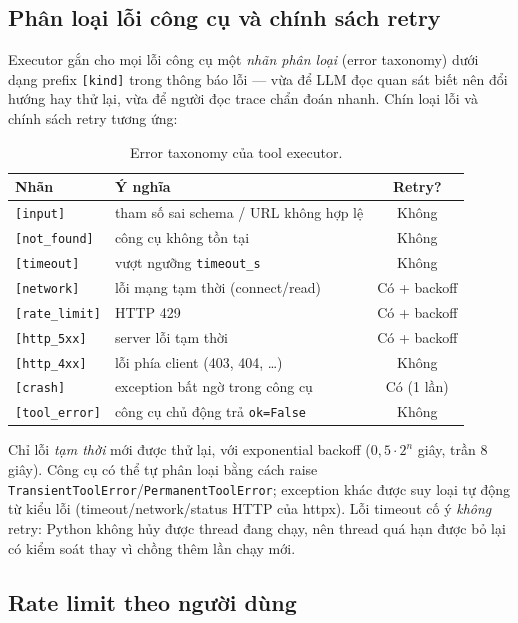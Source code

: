 \subsection{Phân loại lỗi công cụ và chính sách retry}
\label{sec:ky-thuat-taxonomy}

Executor gắn cho mọi lỗi công cụ một \emph{nhãn phân loại} (error taxonomy)
dưới dạng prefix \texttt{[kind]} trong thông báo lỗi --- vừa để LLM đọc quan
sát biết nên đổi hướng hay thử lại, vừa để người đọc trace chẩn đoán nhanh.
Chín loại lỗi và chính sách retry tương ứng:

\begin{table}[ht]
\centering
\caption{Error taxonomy của tool executor.}
\label{tab:error-taxonomy}
\begin{tabular}{llc}
\toprule
Nhãn & Ý nghĩa & Retry? \\
\midrule
\texttt{[input]}      & tham số sai schema / URL không hợp lệ & Không \\
\texttt{[not\_found]}  & công cụ không tồn tại                & Không \\
\texttt{[timeout]}    & vượt ngưỡng \texttt{timeout\_s}       & Không \\
\texttt{[network]}    & lỗi mạng tạm thời (connect/read)      & Có + backoff \\
\texttt{[rate\_limit]} & HTTP 429                             & Có + backoff \\
\texttt{[http\_5xx]}   & server lỗi tạm thời                  & Có + backoff \\
\texttt{[http\_4xx]}   & lỗi phía client (403, 404, \dots)    & Không \\
\texttt{[crash]}      & exception bất ngờ trong công cụ       & Có (1 lần) \\
\texttt{[tool\_error]} & công cụ chủ động trả \texttt{ok=False} & Không \\
\bottomrule
\end{tabular}
\end{table}

Chỉ lỗi \emph{tạm thời} mới được thử lại, với exponential backoff
($0{,}5 \cdot 2^{n}$ giây, trần 8 giây). Công cụ có thể tự phân loại bằng
cách raise \texttt{TransientToolError}/\texttt{PermanentToolError}; exception
khác được suy loại tự động từ kiểu lỗi (timeout/network/status HTTP của
httpx). Lỗi timeout cố ý \emph{không} retry: Python không hủy được thread
đang chạy, nên thread quá hạn được bỏ lại có kiểm soát thay vì chồng thêm
lần chạy mới.

\subsection{Rate limit theo người dùng}
\label{sec:ky-thuat-ratelimit}

